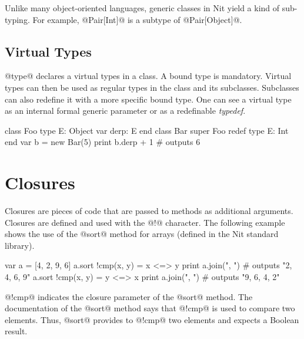 Unlike many object-oriented languages, generic classes in Nit yield a kind of sub-typing.
For example, @Pair[Int]@ is a subtype of @Pair[Object]@.

\subsection{Virtual Types}\label{type}

@type@ declares a virtual types in a class.
A bound type is mandatory.
Virtual types can then be used as regular types in the class and its subclasses.
Subclasses can also redefine it with a more specific bound type.
One can see a virtual type as an internal formal generic parameter or as a redefinable \textit{typedef}.

\begin{lst}
class Foo
	type E: Object
	var derp: E 
end
class Bar
	super Foo
	redef type E: Int
end
var b = new Bar(5)
print b.derp + 1 # outputs 6
\end{lst}

\section{Closures}\label{closure}

Closures are pieces of code that are passed to methods as additional arguments.
Closures are defined and used with the @!@ character.
The following example shows the use of the @sort@ method for arrays (defined in the Nit standard library).

\begin{lst}
var a = [4, 2, 9, 6]
a.sort !cmp(x, y) = x <=> y
print a.join(", ") # outputs "2, 4, 6, 9"
a.sort !cmp(x, y) = y <=> x
print a.join(", ") # outputs "9, 6, 4, 2"
\end{lst}

@!cmp@ indicates the closure parameter of the @sort@ method.
The documentation of the @sort@ method says that @!cmp@ is used to compare two elements.
Thus, @sort@ provides to @!cmp@ two elements and expects a Boolean result. %

